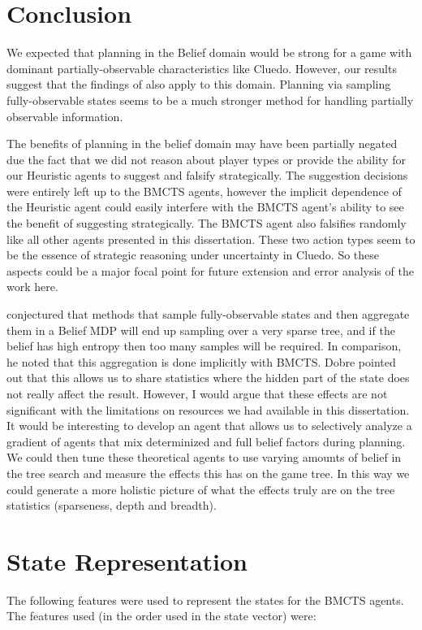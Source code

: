 \documentclass[msc, ai, twoside, notimes, logo, parskip, leftchapter, normalheadings]{infthesis}
\begin{document}
\chapter{Conclusion}
We expected that planning in the Belief domain would be strong for a game with dominant partially-observable characteristics like Cluedo. However, our results suggest that the findings of \citep{Mihai} also apply to this domain. Planning via sampling fully-observable states seems to be a much stronger method for handling partially observable information. 

The benefits of planning in the belief domain may have been partially negated due the fact that we did not reason about player types or provide the ability for our Heuristic agents to suggest and falsify strategically. The suggestion decisions were entirely left up to the BMCTS agents, however the implicit dependence of the Heuristic agent could easily interfere with the BMCTS agent's ability to see the benefit of suggesting strategically. The BMCTS agent also falsifies randomly like all other agents presented in this dissertation. These two action types seem to be the essence of strategic reasoning under uncertainty in Cluedo. So these aspects could be a major focal point for future extension and error analysis of the work here.

\citep{Mihai} conjectured that methods that sample fully-observable states and then aggregate them in a Belief MDP will end up sampling over a very sparse tree, and if the belief has high entropy then too many samples will be required. In comparison, he noted that this aggregation is done implicitly with BMCTS. Dobre pointed out that this allows us to share statistics where the hidden part of the state does not really affect the result. However, I would argue that these effects are not significant with the limitations on resources we had available in this dissertation. It would be interesting to develop an agent that allows us to selectively analyze a gradient of agents that mix determinized and full belief factors during planning. We could then tune these theoretical agents to use varying amounts of belief in the tree search and measure the effects this has on the game tree. In this way we could generate a more holistic picture of what the effects truly are on the tree statistics (sparseness, depth and breadth). 


\appendix
\chapter{State Representation}
The following features were used to represent the states for the BMCTS agents. The features used (in the order used in the state vector) were:
\end{document}
